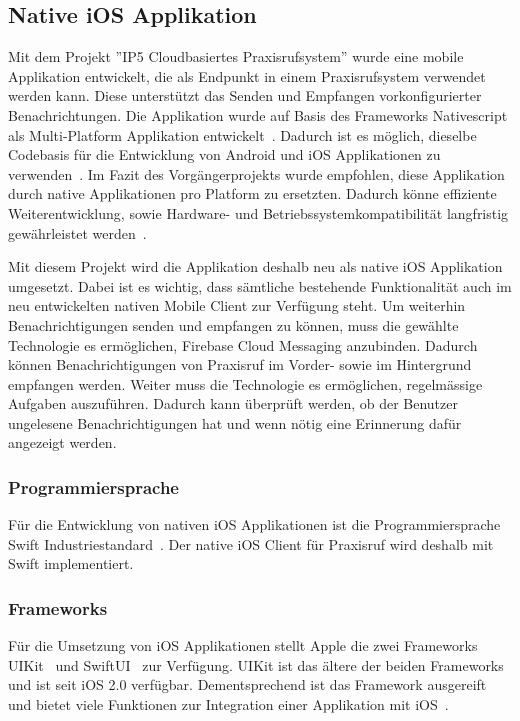 
\subsection{Native iOS Applikation}

Mit dem Projekt ''IP5 Cloudbasiertes Praxisrufsystem'' wurde eine mobile Applikation entwickelt, die als Endpunkt in einem Praxisrufsystem verwendet werden kann.
Diese unterstützt das Senden und Empfangen vorkonfigurierter Benachrichtungen.
Die Applikation wurde auf Basis des Frameworks Nativescript als Multi-Platform Applikation entwickelt~\cite{ip5}.
Dadurch ist es möglich, dieselbe Codebasis für die Entwicklung von Android und iOS Applikationen zu verwenden~\cite{nativescript}.
Im Fazit des Vorgängerprojekts wurde empfohlen, diese Applikation durch native Applikationen pro Platform zu ersetzten.
Dadurch könne effiziente Weiterentwicklung, sowie Hardware- und Betriebssystemkompatibilität langfristig gewährleistet werden~\cite{ip5}.

Mit diesem Projekt wird die Applikation deshalb neu als native iOS Applikation umgesetzt.
Dabei ist es wichtig, dass sämtliche bestehende Funktionalität auch im neu entwickelten nativen Mobile Client zur Verfügung steht.
Um weiterhin Benachrichtigungen senden und empfangen zu können, muss die gewählte Technologie es ermöglichen, Firebase Cloud Messaging anzubinden.
Dadurch können Benachrichtigungen von Praxisruf im Vorder- sowie im Hintergrund empfangen werden.
Weiter muss die Technologie es ermöglichen, regelmässige Aufgaben auszuführen.
Dadurch kann überprüft werden, ob der Benutzer ungelesene Benachrichtigungen hat und wenn nötig eine Erinnerung dafür angezeigt werden.

\subsubsection{Programmiersprache}

Für die Entwicklung von nativen iOS Applikationen ist die Programmiersprache Swift Industriestandard~\cite{ios_swift}.
Der native iOS Client für Praxisruf wird deshalb mit Swift implementiert.

\subsubsection{Frameworks}

Für die Umsetzung von iOS Applikationen stellt Apple die zwei Frameworks UIKit~\cite{ios_uikit} und SwiftUI~\cite{ios_swift_ui} zur Verfügung.
UIKit ist das ältere der beiden Frameworks und ist seit iOS 2.0 verfügbar.
Dementsprechend ist das Framework ausgereift und bietet viele Funktionen zur Integration einer Applikation mit iOS~\cite{ios_uikit}.

